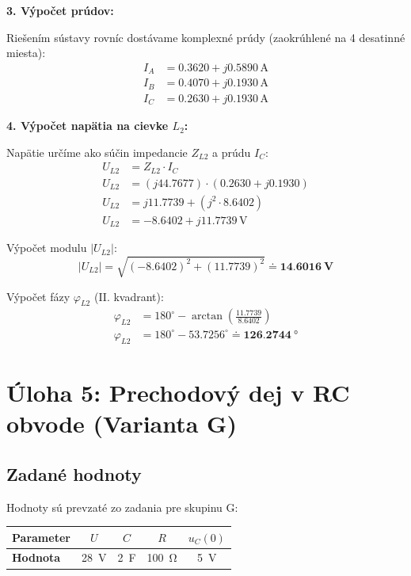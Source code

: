 \documentclass[12pt,a4paper]{article}
\begin{document}
\textbf{3. Výpočet prúdov:}

Riešením sústavy rovníc dostávame komplexné prúdy (zaokrúhlené na 4 desatinné miesta):
\begin{align*}
    I_A & = \num{0,3620} + j\num{0,5890} \, \si{\ampere} \\
    I_B & = \num{0,4070} + j\num{0,1930} \, \si{\ampere} \\
    I_C & = \num{0,2630} + j\num{0,1930} \, \si{\ampere}
\end{align*}

\textbf{4. Výpočet napätia na cievke $L_2$:}

Napätie určíme ako súčin impedancie $Z_{L2}$ a prúdu $I_C$:
\begin{align*}
    U_{L2} & = Z_{L2} \cdot I_C                                      \\
    U_{L2} & = (j\num{44,7677}) \cdot (\num{0,2630} + j\num{0,1930}) \\
    U_{L2} & = j\num{11,7739} + (j^2 \cdot \num{8,6402})             \\
    U_{L2} & = \num{-8,6402} + j\num{11,7739} \, \si{\volt}
\end{align*}

Výpočet modulu $|U_{L2}|$:
\begin{equation*}
    |U_{L2}| = \sqrt{(\num{-8,6402})^2 + (\num{11,7739})^2} \doteq \mathbf{\qty{14,6016}{\volt}}
\end{equation*}

Výpočet fázy $\varphi_{L2}$ (II. kvadrant):
\begin{align*}
    \varphi_{L2} & = 180^\circ - \arctan\left(\frac{\num{11,7739}}{\num{8,6402}}\right)      \\
    \varphi_{L2} & = 180^\circ - \num{53,7256}^\circ \doteq \mathbf{\qty{126,2744}{\degree}}
\end{align*}

\newpage

\section*{Úloha 5: Prechodový dej v RC obvode (Varianta G)}

\subsection*{Zadané hodnoty}
Hodnoty sú prevzaté zo zadania pre skupinu G:

\begin{table}[h!]
    \centering
    \renewcommand{\arraystretch}{1.3}
    \begin{tabular}{|l|c|c|c|c|}
        \hline
        \textbf{Parameter} & $U$             & $C$             & $R$             & $u_C(0)$       \\ \hline
        \textbf{Hodnota}   & \qty{28}{\volt} & \qty{2}{\farad} & \qty{100}{\ohm} & \qty{5}{\volt} \\ \hline
    \end{tabular}
\end{table}
\end{document}
